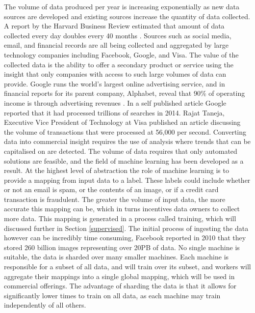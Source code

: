 \documentclass[12pt]{article}
\begin{document}
The volume of data produced per year is increasing exponentially as new data sources are developed and existing sources increase the quantity of data collected. A report by the Harvard Business Review estimated that amount of data collected every day doubles every 40 months \cite{hbrBigData}. Sources such as social media, email, and financial records are all being collected and aggregated by large technology companies including Facebook, Google, and Visa. The value of the collected data is the ability to offer a secondary product or service using the insight that only companies with access to such large volumes of data can provide.
\newline
\newline
Google runs the world's largest online advertising service, and in financial reports for its parent company, Alphabet, reveal that 90\% of operating income is through advertising revenues \cite{alphabetFinancials}. In a self published article \cite{googleTrends2014} Google reported that it had processed trillions of searches in 2014. Rajat Taneja, Executive Vice President of Technology at Visa published an article \cite{visaMachineLearning} discussing the volume of transactions that were processed at 56,000 per second.
\newline
\newline
Converting data into commercial insight requires the use of analysis where trends that can be capitalised on are detected. The volume of data requires that only automated solutions are feasible, and the field of machine learning has been developed as a result. At the highest level of abstraction the role of machine learning is to provide a mapping from input data to a label. These labels could include whether or not an email is spam, or the contents of an image, or if a credit card transaction is fraudulent. The greater the volume of input data, the more accurate this mapping can be, which in turns incentives data owners to collect more data. This mapping is generated in a process called training, which will discussed further in Section \ref{supervised}.
\newline
\newline
The initial process of ingesting the data however can be incredibly time consuming, Facebook reported in 2010\cite{facebookHaystack} that they stored 260 billion images representing over 20PB of data. No single machine is suitable, the data is sharded over many smaller machines. Each machine is responsible for a subset of all data, and will train over its subset, and workers will aggregate their mappings into a single global mapping, which will be used in commercial offerings. The advantage of sharding the data is that it allows for significantly lower times to train on all data, as each machine may train independently of all others.
\end{document}
